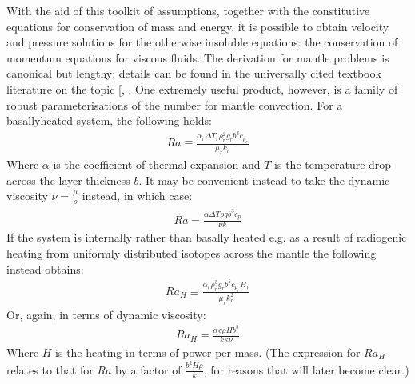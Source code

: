 \documentclass[letterpaper,10pt,english]{jupyterBook}
\begin{document}
\sphinxAtStartPar
With the aid of this toolkit of assumptions, together with the constitutive equations for conservation of mass and energy, it is possible to obtain velocity and pressure solutions for the otherwise insoluble  equations: the conservation of momentum equations for viscous fluids. The derivation for mantle problems is canonical but lengthy; details can be found in the universally cited textbook literature on the topic {[}, \sphinxcite{references:id88}{]}. One extremely useful product, however, is a family of robust parameterisations of the  number for mantle convection. For a basally\sphinxhyphen{}heated system, the following holds:
\begin{equation*}
\begin{split} Ra \equiv \frac{\alpha_r \Delta T_r \rho_r^2 g_r b^3 c_{p_r}}{\mu_r k_r} \end{split}
\end{equation*}
\sphinxAtStartPar
Where \(\alpha\) is the coefficient of thermal expansion and \(T\) is the temperature drop across the layer thickness \(b\). It may be convenient instead to take the dynamic viscosity \(\nu=\frac{\mu}{\rho}\) instead, in which case:
\begin{equation*}
\begin{split} Ra = \frac{\alpha \Delta T \rho g b^3 c_p}{\nu k} \end{split}
\end{equation*}
\sphinxAtStartPar
If the system is internally rather than basally heated \sphinxhyphen{} e.g. as a result of radiogenic heating from uniformly distributed isotopes across the mantle \sphinxhyphen{} the following instead obtains:
\begin{equation*}
\begin{split} Ra_H \equiv \frac{\alpha_r \rho_r^3 g_r b^5 c_{p_r} H_r}{\mu_r k_r^2} \end{split}
\end{equation*}
\sphinxAtStartPar
Or, again, in terms of dynamic viscosity:
\begin{equation*}
\begin{split} Ra_H = \frac{\alpha g \rho H b^5}{k \kappa \nu} \end{split}
\end{equation*}
\sphinxAtStartPar
Where \(H\) is the heating in terms of power per mass. (The expression for \(Ra_H\) relates to that for \(Ra\) by a factor of \(\frac{b^2 H \rho}{k}\), for reasons that will later become clear.)
\end{document}
